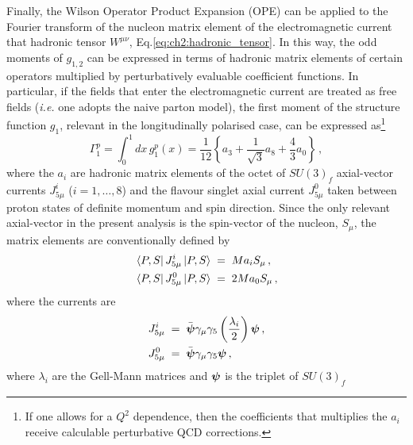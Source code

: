 Finally, the Wilson Operator Product Expansion (OPE) can be applied to the Fourier transform of the nucleon matrix element of the electromagnetic current that hadronic tensor $W^{\mu \nu}$, Eq.\eqref{eq:ch2:hadronic_tensor}. In this way, the odd moments of $g_{1,2}$ can be expressed in terms of hadronic matrix elements of certain operators multiplied by perturbatively evaluable coefficient functions. In particular, if the fields that enter the electromagnetic current are treated as free fields (\textit{i.e.} one adopts the naive parton model), the first moment of the structure function $g_1$, relevant in the longitudinally polarised case, can be expressed as\footnote{If one allows for a $Q^2$ dependence, then the coefficients that multiplies the $a_i$ receive calculable  perturbative QCD corrections.}
\begin{equation}
  \Gamma_{1}^{p} = \int_{0}^{1} dx \, g_{1}^{p}(x) = \frac{1}{12} \left\{ a_3 + \frac{1}{\sqrt{3}} a_8 + \frac{4}{3} a_{0} \right\}\,,
  \label{eq:g1_m1}
\end{equation}
where the $a_i$ are hadronic matrix elements of the octet of $SU(3)_{f}$ axial-vector currents $J^{i}_{5 \mu}$ ($i=1,\dots,8$) and the flavour singlet axial current $J^{0}_{5 \mu}$ taken between proton states of definite momentum and spin direction. Since the only relevant axial-vector in the present analysis is the spin-vector of the nucleon, $S_{\mu}$, the matrix elements are conventionally defined by
\begin{align}
  & \bra{P,S} J_{5 \mu}^{i} \ket{P,S} \hspace{1mm} = \hspace{1mm} M a_{i} S_{\mu} \,,
  \\
  & \bra{P,S} J_{5 \mu}^{0} \ket{P,S} \hspace{1mm} = \hspace{1mm} 2 M a_{0} S_{\mu} \,,
\end{align}
where the currents are
\begin{align}
  & J_{5 \mu}^{i} \hspace{1mm} = \hspace{1mm} \bar{\vb*{\psi}} \gamma_{\mu} \gamma_{5} \left( \frac{\lambda_{i}}{2} \right) \vb*{\psi}\, ,\\
  & J_{5 \mu}^{0} \hspace{1mm} = \hspace{1mm} \bar{\vb*{\psi}} \gamma_{\mu} \gamma_{5} \vb*{\psi}\, ,
\end{align}
where $\lambda_{i}$ are the Gell-Mann matrices and $\vb*{\psi}$ is the triplet of $SU(3)_{f}$ 
